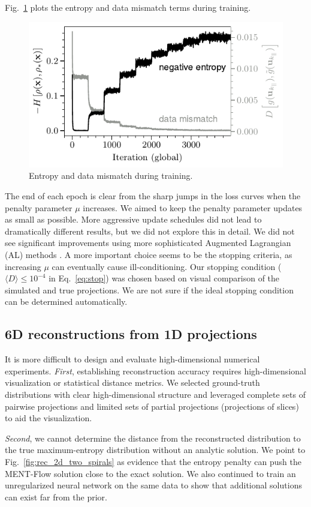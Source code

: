 \documentclass[%
    reprint,
    twocolumn,
    nofootinbib,
    amsmath,
    amssymb,
    aps,
    prstab,
]{revtex4-2}
\begin{document}
Fig.~\ref{fig:loss} plots the entropy and data mismatch terms during training.
%
\begin{figure}
    \centering
    \includegraphics[width=0.9\columnwidth]{fig_loss.pdf}
    \caption{Entropy and data mismatch during training.}
    \label{fig:loss}
\end{figure}
%
The end of each epoch is clear from the sharp jumps in the loss curves when the penalty parameter $\mu$ increases.
We aimed to keep the penalty parameter updates as small as possible. More aggressive update schedules did not lead to dramatically different results, but we did not explore this in detail. We did not see significant improvements using more sophisticated Augmented Lagrangian (AL) methods \cite{Loaiza_2016, Basir_2023}. A more important choice seems to be the stopping criteria, as increasing $\mu$ can eventually cause ill-conditioning. Our stopping condition ($\langle D \rangle \le 10^{-4}$ in Eq.~\eqref{eq:stop}) was chosen based on visual comparison of the simulated and true projections. We are not sure if the ideal stopping condition can be determined automatically.


\subsection{6D reconstructions from 1D projections}

It is more difficult to design and evaluate high-dimensional numerical experiments. \textit{First}, establishing reconstruction accuracy requires high-dimensional visualization or statistical distance metrics. We selected ground-truth distributions with clear high-dimensional structure and leveraged complete sets of pairwise projections and limited sets of partial projections (projections of slices) to aid the visualization.

\textit{Second}, we cannot determine the distance from the reconstructed distribution to the true maximum-entropy distribution without an analytic solution. We point to Fig.~\ref{fig:rec_2d_two_spirals} as evidence that the entropy penalty can push the MENT-Flow solution close to the exact solution. We also continued to train an unregularized neural network on the same data to show that additional solutions can exist far from the prior.
\end{document}
